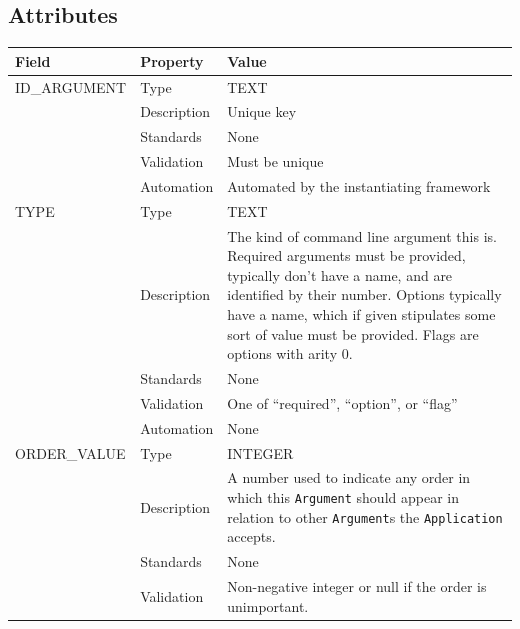 \documentclass[
]{article}
\newcounter{none} %
\begin{document}
\subsection{Attributes}\label{attributes-3}

{\def\LTcaptype{none} %
\begin{longtable}[]{@{}
  >{\raggedright\arraybackslash}p{}
  >{\raggedright\arraybackslash}p{}
  >{\raggedright\arraybackslash}p{}@{}}
\toprule\noalign{}
\begin{minipage}[b]{\linewidth}\raggedright
Field
\end{minipage} & \begin{minipage}[b]{\linewidth}\raggedright
Property
\end{minipage} & \begin{minipage}[b]{\linewidth}\raggedright
Value
\end{minipage} \\
\midrule\noalign{}
\endhead
\bottomrule\noalign{}
\endlastfoot
ID\_ARGUMENT & Type & TEXT \\
& Description & Unique key \\
& Standards & None \\
& Validation & Must be unique \\
& Automation & Automated by the instantiating framework \\
TYPE & Type & TEXT \\
& Description & The kind of command line argument this is. Required
arguments must be provided, typically don't have a name, and are
identified by their number. Options typically have a name, which if
given stipulates some sort of value must be provided. Flags are options
with arity 0. \\
& Standards & None \\
& Validation & One of ``required'', ``option'', or ``flag'' \\
& Automation & None \\
ORDER\_VALUE & Type & INTEGER \\
& Description & A number used to indicate any order in which this
\texttt{Argument} should appear in relation to other \texttt{Argument}s
the \texttt{Application} accepts. \\
& Standards & None \\
& Validation & Non-negative integer or null if the order is
unimportant. \\

\end{longtable}}
\end{document}
